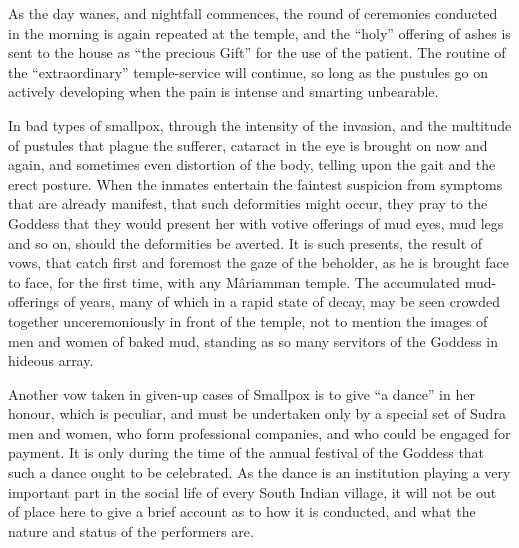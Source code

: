 \documentclass[a4paper, 12pt, oneside, english, twocolumn]{article}
\begin{document}
As the day wanes, and nightfall commences, the round of ceremonies conducted in the morning is again repeated at the temple, and the ``holy'' offering of ashes is sent to the house as ``the precious Gift'' for the use of the patient. The routine of the ``extraordinary'' temple-service will continue, so long as the pustules go on actively developing when the pain is intense and smarting unbearable.

In bad types of smallpox, through the intensity of the invasion, and the multitude of pustules that plague the sufferer, cataract in the eye is brought on now and again, and sometimes even distortion of the body, telling upon the gait and the erect posture. When the inmates entertain the faintest suspicion from symptoms that are already manifest, that such deformities might occur, they pray to the Goddess that they would present her with votive offerings of mud eyes, mud legs and so on, should the deformities be averted. It is such presents, the result of vows, that catch first and foremost the gaze of the beholder, as he is brought face to face, for the first time, with any Mâriamman temple. The accumulated mud-offerings of years, many of which in a rapid state of decay, may be seen crowded together unceremoniously in front of the temple, not to mention the images of men and women of baked mud, standing as so many servitors of the Goddess in hideous array.

Another vow taken in given-up cases of Smallpox is to give ``a dance'' in her honour, which is peculiar, and must be undertaken only by a special set of Sudra men and women, who form professional companies, and who could be engaged for payment. It is only during the time of the annual festival of the Goddess that such a dance ought to be celebrated. As the dance is an institution playing a very important part in the social life of every South Indian village, it will not be out of place here to give a brief account as to how it is conducted, and what the nature and status of the performers are.
\end{document}
